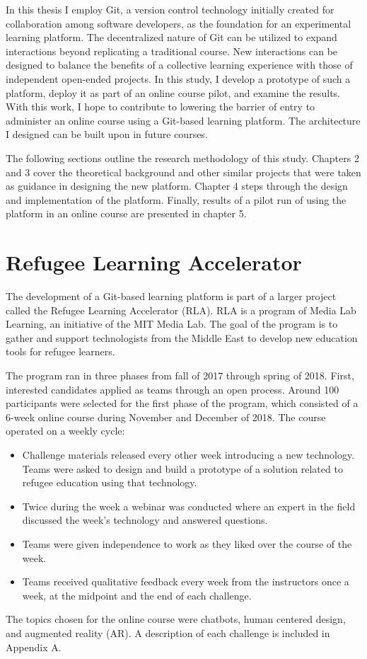 \documentclass[12pt,twoside]{mitthesis}
\newcommand{\draft}[1]{{\color{blue} #1}}
\begin{document}
In this thesis I employ Git, a version control technology initially created for collaboration among software developers, as the foundation for an experimental learning platform. The decentralized nature of Git can be utilized to expand interactions beyond replicating a traditional course. New interactions can be designed to balance the benefits of a collective learning experience with those of independent open-ended projects. In this study, I develop a prototype of such a platform, deploy it as part of an online course pilot, and examine the results. With this work, I hope to contribute to lowering the barrier of entry to administer an online course using a Git-based learning platform. The architecture I designed can be built upon in future courses. 

The following sections outline the research methodology of this study. Chapters 2 and 3 cover the theoretical background and other similar projects that were taken as guidance in designing the new platform. Chapter 4 steps through the design and implementation of the platform. Finally, results of a pilot run of using the platform in an online course are presented in chapter 5. 

\section{Refugee Learning Accelerator}

The development of a Git-based learning platform is part of a larger project called the Refugee Learning Accelerator (RLA). RLA is a program of Media Lab Learning, an initiative of the MIT Media Lab. The goal of the program is to gather and support technologists from the Middle East to develop new education tools for refugee learners. 

\draft{The program ran in three phases from fall of 2017 through spring of 2018. First, interested candidates applied as teams through an open process. Around 100 participants were selected for the first phase of the program, which consisted of a 6-week online course during November and December of 2018. The course operated on a weekly cycle:
\begin{itemize}
\item Challenge materials released every other week introducing a new technology. Teams were asked to design and build a prototype of a solution related to refugee education using that technology.
\item Twice during the week a webinar was conducted where an expert in the field discussed the week's technology and answered questions.
\item Teams were given independence to work as they liked over the course of the week.
\item Teams received qualitative feedback every week from the instructors once a week, at the midpoint and the end of each challenge.
\end{itemize}
The topics chosen for the online course were chatbots, human centered design, and augmented reality (AR). A description of each challenge is included in Appendix A.}
\end{document}
